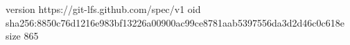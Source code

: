 version https://git-lfs.github.com/spec/v1
oid sha256:8850c76d1216e983bf13226a00900ac99ce8781aab5397556da3d2d46c0c618e
size 865
